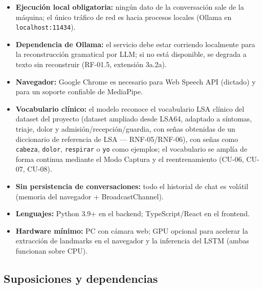 \begin{itemize}
    \item \textbf{Ejecución local obligatoria:} ningún dato de la conversación sale de la máquina; el único tráfico de red es hacia procesos locales (Ollama en \texttt{localhost:11434}).
    \item \textbf{Dependencia de Ollama:} el servicio debe estar corriendo localmente para la reconstrucción gramatical por LLM; si no está disponible, se degrada a texto sin reconstruir (RF-01.5, extensión 3a.2a).
    \item \textbf{Navegador:} Google Chrome es necesario para Web Speech API (dictado) y para un soporte confiable de MediaPipe.
    \item \textbf{Vocabulario clínico:} el modelo reconoce el vocabulario LSA clínico del dataset del proyecto (dataset ampliado desde LSA64, adaptado a síntomas, triaje, dolor y admisión/recepción/guardia, con señas obtenidas de un diccionario de referencia de LSA --- RNF-05/RNF-06), con señas como \texttt{cabeza}, \texttt{dolor}, \texttt{respirar} o \texttt{yo} como ejemplos; el vocabulario se amplía de forma continua mediante el Modo Captura y el reentrenamiento (CU-06, CU-07, CU-08).
    \item \textbf{Sin persistencia de conversaciones:} todo el historial de chat es volátil (memoria del navegador + BroadcastChannel).
    \item \textbf{Lenguajes:} Python 3.9+ en el backend; TypeScript/React en el frontend.
    \item \textbf{Hardware mínimo:} PC con cámara web; GPU opcional para acelerar la extracción de landmarks en el navegador y la inferencia del LSTM (ambas funcionan sobre CPU).
\end{itemize}

\subsection{Suposiciones y dependencias}

